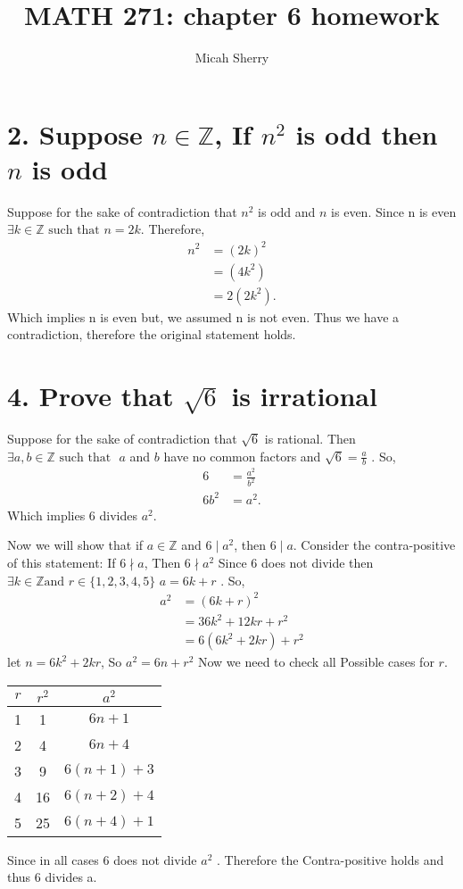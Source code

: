 \documentclass{article}
\title{MATH 271: chapter 6 homework}
\author{Micah Sherry}
\newcommand{\ints}{\mathbb{Z}}
\newcommand{\st}{\text{ such that }}
\begin{document}
	\maketitle
	
	\section*{2. Suppose $n \in \ints$, If $n^2$ is odd then $n$ is odd} 
	
	Suppose for the sake of contradiction that $n^2$ is odd and $n$ is even.
	Since n is even $\exists k \in \ints \st n=2k$.
	Therefore,
	 \begin{align*}
	 	n^2 &= (2k)^2\\
	 	    &= (4k^2)\\
	 	    &= 2(2k^2).
	 \end{align*}
	Which implies n is even but, we assumed n is not even.
	Thus we have a contradiction, therefore the original statement holds.
	
	\section*{4. Prove that $\sqrt{6}$ is irrational}
	
	Suppose for the sake of contradiction that $\sqrt{6}$ is rational. 
	Then $\exists a,b \in \ints \st $ $a$ and $b$ have no common factors and $\sqrt{6}= \frac{a}{b}$ .
	So, 
	\begin{align*}
		6    &= \frac{a^2}{b^2}\\
		6b^2 &= a^2. 
	\end{align*}
	Which implies 6 divides $a^2$.
	

	Now we will show that if $a \in \ints$ and $6 \mid a^2$, then $6 \mid a$.
	Consider the contra-positive of this statement: If $6 \nmid a$, Then $6 \nmid a^2$
	Since 6 does not divide then $ \exists k \in \ints \text{and } r \in \{1,2,3,4,5\} $ \st $ a= 6k+r$ .
	So,
	\begin{align*}
		a^2 &= (6k+r)^2\\
		    &=36k^2+ 12kr + r^2\\
		    &= 6(6k^2 + 2kr) + r^2
	\end{align*}
	let $n = 6k^2 + 2kr$, So $a^2 = 6n + r^2$ 
	Now we need to check all Possible cases for $r$.
	
	\begin{table}[h]
		\centering
		\begin{tabular}{|c|c|c|}
			\hline
			$r$ & $r^2$ & $a^2$\\
			\hline
			1 & 1   & $6n+1$\\
			2 & 4   & $6n+4$\\
			3 & 9   & $6(n+1)+3$\\
			4 & 16  & $6(n+2)+4$\\
			5 & 25  & $6(n+4)+1$\\					
			\hline
		\end{tabular}
		\label{tab: cases for r}
	\end{table}
	Since in all cases 6 does not divide $a^2$ . Therefore the Contra-positive holds and thus 6 divides a.
	
\end{document}

